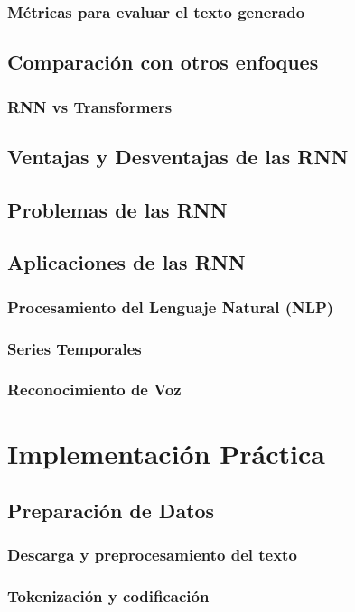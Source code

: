 \documentclass{article}
\begin{document}
\subsubsection{Métricas para evaluar el texto generado}

\subsection{Comparación con otros enfoques}
\subsubsection{RNN vs Transformers}

\subsection{Ventajas y Desventajas de las RNN}
\subsection{Problemas de las RNN}
\subsection{Aplicaciones de las RNN}
\subsubsection{Procesamiento del Lenguaje Natural (NLP)}
\subsubsection{Series Temporales}
\subsubsection{Reconocimiento de Voz}

\newpage

\section{Implementación Práctica}
\subsection{Preparación de Datos}
\subsubsection{Descarga y preprocesamiento del texto}
\subsubsection{Tokenización y codificación}
\end{document}
